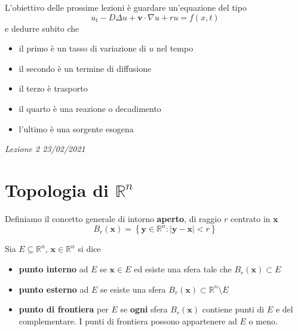 \documentclass[10pt,a4paper,twoside,openright]{book}
\newcommand{\x}{\mathbf{x}}
\newcommand{\y}{\mathbf{y}}
\begin{document}
L'obiettivo delle prossime lezioni è guardare un'equazione del tipo
\begin{equation*}
u_{t} -D\Delta u+\mathbf{v} \cdotp \nabla u+ru=f(x,t)
\end{equation*}
e dedurre subito che
\begin{itemize}
\item il primo è un tasso di variazione di $u$ nel tempo
\item il secondo è un termine di diffusione
\item il terzo è trasporto
\item il quarto è una reazione o decadimento
\item l'ultimo è una sorgente esogena
\end{itemize}



\textit{Lezione 2 23/02/2021}
\section{Topologia di \texorpdfstring{$\mathbb{R}^{n}$}{Rn}}
\begin{definition}
 Definiamo il concetto generale di intorno \textbf{aperto}, di raggio $\displaystyle r$ centrato in $\displaystyle \mathbf{x}$
\begin{equation*}
B_{r}(\x) =\left\{\y\in \mathbb{R}^{n} :| \y-\x| < r\right\}
\end{equation*}
\end{definition}
Sia $E\subseteq \mathbb{R}^{n}$, $\x\in \mathbb{R}^{n}$ si dice
\begin{itemize}
\item \textbf{punto interno} ad $E$ se $\x\in E$ ed esiste una sfera tale che $B_{r}(\x) \subset E$
\item \textbf{punto esterno} ad $E$ se esiste una sfera $B_{r}(\x) \subset \mathbb{R}^{n} \setminus E$
\item \textbf{punto di frontiera} per $E$ se \textbf{ogni} sfera $B_{r}(\x)$ contiene punti di $E$ e del complementare. I punti di frontiera possono appartenere ad $E$ o meno.
\end{itemize}
\end{document}
